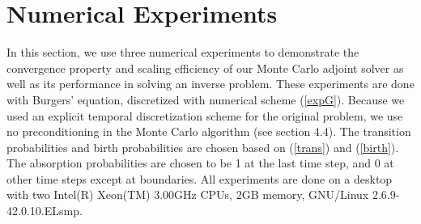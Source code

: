\documentclass{elsart}
\theoremstyle{remark}
\theoremstyle{definition}
\theoremstyle{proof}
\begin{document}
    \vspace{3mm}\hspace{-12mm}
    \vspace{3mm}





\section{Numerical Experiments}
    In this section, we use three numerical experiments to demonstrate
    the convergence property and scaling efficiency of our Monte Carlo
    adjoint solver as well as its performance in solving an inverse
    problem.  These experiments are done with Burgers' equation,
    discretized with numerical scheme (\ref{expG}).  Because we used an
    explicit temporal discretization scheme for the original problem,
    we use no preconditioning in the Monte Carlo algorithm (see section 4.4).
    The transition probabilities and birth probabilities are chosen based
    on (\ref{trans}) and (\ref{birth}).  The absorption probabilities are
    chosen to be 1 at the last time step, and 0 at other time steps except
    at boundaries.  All experiments are done on a desktop with two Intel(R)
    Xeon(TM) 3.00GHz CPUs, 2GB memory, GNU/Linux 2.6.9-42.0.10.ELsmp.
    
\end{document}
